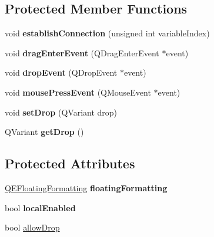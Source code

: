 \subsection*{Protected Member Functions}
\begin{DoxyCompactItemize}
\item 
\hypertarget{classQEPlot_a486278d28e22bc66942adc9cf119b246}{
void {\bfseries establishConnection} (unsigned int variableIndex)}
\label{classQEPlot_a486278d28e22bc66942adc9cf119b246}

\item 
\hypertarget{classQEPlot_afd75b9311494c38dc222e9325c39f780}{
void {\bfseries dragEnterEvent} (QDragEnterEvent $\ast$event)}
\label{classQEPlot_afd75b9311494c38dc222e9325c39f780}

\item 
\hypertarget{classQEPlot_a72531f24c6a4dc5ba8c244016bda103c}{
void {\bfseries dropEvent} (QDropEvent $\ast$event)}
\label{classQEPlot_a72531f24c6a4dc5ba8c244016bda103c}

\item 
\hypertarget{classQEPlot_a3aa028b47ecef680bf6d1ef72bf8a10f}{
void {\bfseries mousePressEvent} (QMouseEvent $\ast$event)}
\label{classQEPlot_a3aa028b47ecef680bf6d1ef72bf8a10f}

\item 
\hypertarget{classQEPlot_ac37a481fc830d836b6beebb78316c9c5}{
void {\bfseries setDrop} (QVariant drop)}
\label{classQEPlot_ac37a481fc830d836b6beebb78316c9c5}

\item 
\hypertarget{classQEPlot_addbd0966845973c7f957e2b57a2c0d4d}{
QVariant {\bfseries getDrop} ()}
\label{classQEPlot_addbd0966845973c7f957e2b57a2c0d4d}

\end{DoxyCompactItemize}
\subsection*{Protected Attributes}
\begin{DoxyCompactItemize}
\item 
\hypertarget{classQEPlot_a3bb434075a63e9dfabdf43781a68b92a}{
\hyperlink{classQEFloatingFormatting}{QEFloatingFormatting} {\bfseries floatingFormatting}}
\label{classQEPlot_a3bb434075a63e9dfabdf43781a68b92a}

\item 
\hypertarget{classQEPlot_a62ab0c282a776fdf485ab09079a0fac4}{
bool {\bfseries localEnabled}}
\label{classQEPlot_a62ab0c282a776fdf485ab09079a0fac4}

\item 
bool \hyperlink{classQEPlot_aa68e5b9bb3c26d62b65e524970d67159}{allowDrop}
\end{DoxyCompactItemize}
